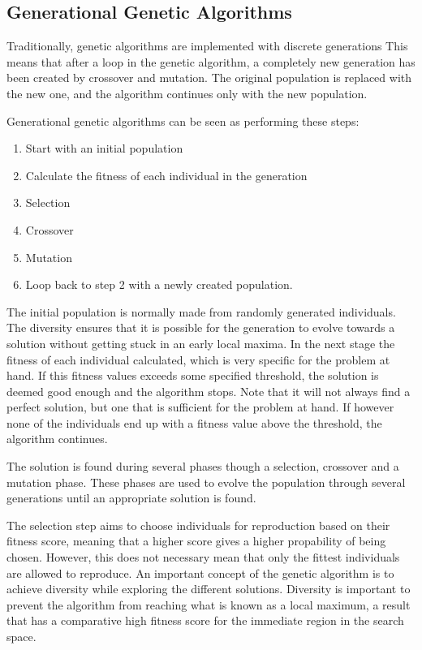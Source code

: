 \subsection{Generational Genetic Algorithms} \label{background:generational_genetic_algorithms}
Traditionally, genetic algorithms are implemented with discrete generations \cite{hromkovic}
This means that after a loop in the genetic algorithm, a completely new generation has been created by crossover and mutation.
The original population is replaced with the new one, and the algorithm continues only with the new population.

Generational genetic algorithms can be seen as performing these steps:


\begin{enumerate}
    \item Start with an initial population
    \item Calculate the fitness of each individual in the generation
    \item Selection
    \item Crossover
    \item Mutation  
    \item Loop back to step 2 with a newly created population.
\end{enumerate}

The initial population is normally made from randomly generated individuals.
The diversity ensures that it is possible for the generation to evolve towards a solution without getting stuck in an early local maxima.
In the next stage the fitness of each individual calculated, which is very specific for the problem at hand.
If this fitness values exceeds some specified threshold, the solution is deemed good enough and the algorithm stops.
Note that it will not always find a perfect solution, but one that is sufficient for the problem at hand.
If however none of the individuals end up with a fitness value above the threshold, the algorithm continues.

The solution is found during several phases though a selection, crossover and a mutation phase. 
These phases are used to evolve the population through several generations until an appropriate solution is found. 

The selection step aims to choose individuals for reproduction based on their fitness score, meaning that a higher score gives a higher propability of being chosen.
However, this does not necessary mean that only the fittest individuals are allowed to reproduce.
An important concept of the genetic algorithm is to achieve diversity while exploring the different solutions.
Diversity is important to prevent the algorithm from reaching what is known as a local maximum, a result that has a comparative high fitness score for the immediate region in the \gls{search space}.

